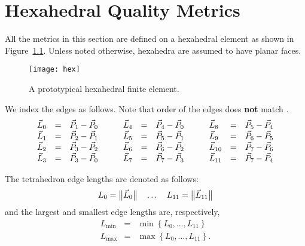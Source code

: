 \chapter{Hexahedral Quality Metrics\label{s:hex}}

All the metrics in this section are defined on a hexahedral element
as shown in Figure~\ref{f:hex}.
Unless noted otherwise, hexahedra are assumed to have planar faces.

\begin{figure}[bhp]
  \centering
  \texttt{[image: hex]}
  \caption{A prototypical hexahedral finite element.%
                                                                  \label{f:hex}}
\end{figure}

We index the edges as follows.
Note that order of the edges does \textbf{not} match \vtk.
\begin{equation*}
\begin{array}{lclcl}
  \vec L_0    &=& \vec P_1 - \vec P_0\\
  \vec L_1    &=& \vec P_2 - \vec P_1\\
  \vec L_2    &=& \vec P_3 - \vec P_2\\
  \vec L_3    &=& \vec P_3 - \vec P_0
\end{array}\rule{2em}{0pt}
\begin{array}{lclcl}
  \vec L_4    &=& \vec P_4 - \vec P_0\\
  \vec L_5    &=& \vec P_5 - \vec P_1\\
  \vec L_6    &=& \vec P_6 - \vec P_2\\
  \vec L_7    &=& \vec P_7 - \vec P_3
\end{array}\rule{2em}{0pt}
\begin{array}{lclcl}
  \vec L_8    &=& \vec P_5 - \vec P_4\\
  \vec L_9    &=& \vec P_6 - \vec P_5\\
  \vec L_{10} &=& \vec P_7 - \vec P_6\\
  \vec L_{11} &=& \vec P_7 - \vec P_4
\end{array}
\end{equation*}

The tetrahedron edge lengths are denoted as follows:
\[
L_0 = \big\lVert{\vec L_0}\big\rVert\quad
\dots\quad
L_{11} = \big\lVert{\vec L_{11}}\big\rVert
\]
and the largest and smallest edge lengths are, respectively,
\begin{equation*}
\begin{array}{lcl}
  L_{\min} &=& \min\left\{L_0, \dots, L_{11} \right\}\\
  L_{\max} &=& \max\left\{L_0, \dots, L_{11} \right\}.
\end{array}
\end{equation*}

